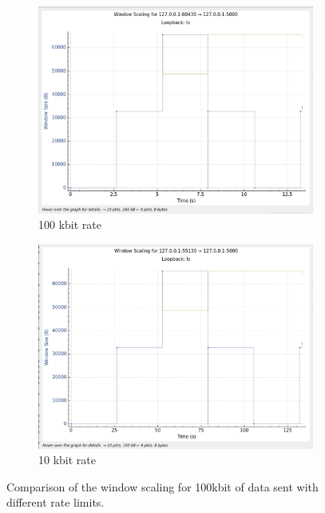 \documentclass{report}
\begin{document}
\begin{figure}[H]
    \begin{subfigure}[b]{0.45\textwidth}
        \centering
        \includegraphics[width=\textwidth]{Pics/Cubic/r100kbit_s100k_ws}
        \caption{100 kbit rate}
    \end{subfigure}
    \hfill
    \begin{subfigure}[b]{0.45\textwidth}
        \centering
        \includegraphics[width=\textwidth]{Pics/Cubic/r10kbit_s100kbit_ws}
        \caption{10 kbit rate}
    \end{subfigure}
    \caption{Comparison of the window scaling for 100kbit of data sent with different rate limits.}
    \label{fig:four_images}
\end{figure}
\end{document}
